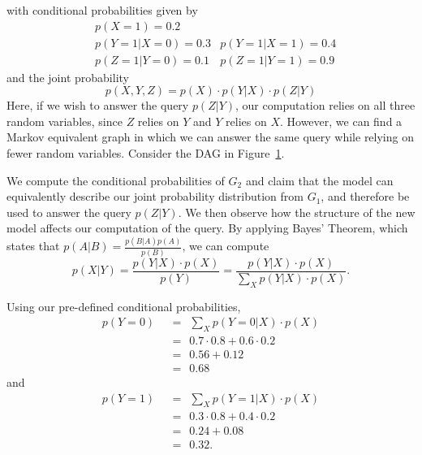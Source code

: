 with conditional probabilities given by
\begin{align*}
	& p(X=1) = 0.2 			& \\
	& p(Y = 1 | X = 0) = 0.3		& p(Y = 1 | X = 1) = 0.4 \\ 
	& p(Z = 1 | Y = 0) = 0.1		& p(Z = 1 | Y = 1) = 0.9 
\end{align*}
and the joint probability
$$ p(X,Y,Z) = p(X) \cdot  p(Y|X) \cdot  p(Z|Y)$$
\null \quad \quad Here, if we wish to answer the query $p(Z|Y)$, our computation relies on all three random variables, since $Z$ relies on $Y$ and $Y$ relies on $X$. However, we can find a Markov equivalent graph in which we can answer the same query while relying on fewer random variables. Consider the DAG in Figure~\ref{fig:introdag}. 

\begin{figure}[h!]
\begin{center}
\end{center}
\caption{}
\label{fig:introdag}
\end{figure}
\null \quad \quad We compute the conditional probabilities of $G_{2}$ and claim that the model can equivalently describe our joint probability distribution from $G_{1}$, and therefore be used to answer the query $p(Z|Y)$. We then observe how the structure of the new model affects our computation of the query. By applying Bayes' Theorem, which states that $p(A|B) = \frac{p(B|A)p(A)}{p(B)}$, we can compute
$$p(X|Y) = \frac{p(Y|X) \cdot p(X)}{p(Y)}  =  \frac{ p(Y|X) \cdot p(X) }{ \sum_{X} p(Y|X) \cdot p(X) }.$$

Using our pre-defined conditional probabilities,
\begin{align*}
	p(Y = 0) 	& \ \ = \ \ \sum_{X} p(Y = 0|X) \cdot p(X) \\ 
			& \ \ = \ \ 0.7 \cdot 0.8 + 0.6 \cdot 0.2 \\
			& \ \ = \ \ 0.56 + 0.12 \\
			& \ \ = \ \ 0.68
\end{align*}
and 
\begin{align*}
	p(Y = 1) 	& \ \ = \ \ \sum_{X} p(Y = 1|X) \cdot p(X) \\ 
			& \ \ = \ \ 0.3 \cdot 0.8 + 0.4 \cdot 0.2 \\
			& \ \ = \ \ 0.24 + 0.08 \\
			& \ \ = \ \ 0.32.
\end{align*}

